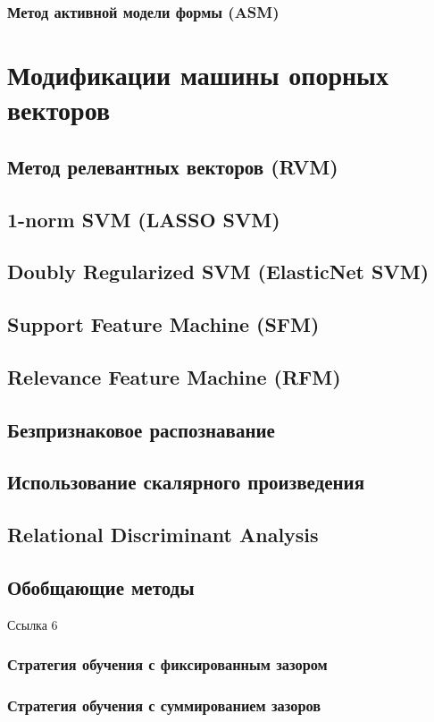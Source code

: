 \documentclass[12pt,a4paper]{article}
\begin{document}
\subsubsection{Метод активной модели формы (ASM)}
\section{Модификации машины опорных векторов}
\subsection{Метод релевантных векторов (RVM)}
\subsection{1-norm SVM (LASSO SVM)}
\subsection{Doubly Regularized SVM (ElasticNet SVM)}
\subsection{Support Feature Machine (SFM)}
\subsection{Relevance Feature Machine (RFM)}
\subsection{Безпризнаковое распознавание}
\subsection{Использование скалярного произведения}
\subsection{Relational Discriminant Analysis}
\subsection{Обобщающие методы}
Ссылка 6
\subsubsection{Стратегия обучения с фиксированным зазором}
\subsubsection{Стратегия обучения с суммированием зазоров}
\end{document}
